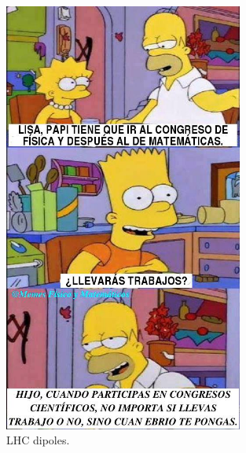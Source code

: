 \begin{figure}[!h]
  \centering
  \includegraphics[width=0.7\textwidth]{../images/ch2/2}
  \caption[LHC dipoles]{LHC dipoles.}\label{fig:cms_layout}
\end{figure}


